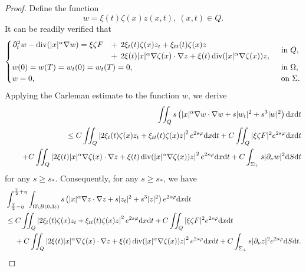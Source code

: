 \documentclass[11pt]{article}
\numberwithin{equation}{section}
\def\pt{\partial}
\def\e{\varepsilon }
\def\vp{\varphi}
\def\pt{\partial}
\def\Om{\Omega}
\def\al{\alpha}
\def\f{\frac}
\def\se{\setminus}
\def\df{\mathrm d}
\DeclareMathOperator{\Div}{div}
\begin{document}
\begin{proof}
			
			Define the function
			\begin{equation*}
				w=\xi(t)\zeta(x) z(x,t), \ (x,t)\in Q.
			\end{equation*}
			It can be readily verified that
			\begin{equation*}
				\begin{cases}
					\hspace{-1.5mm}
					\begin{array}{lll}
						\pt_t^2w-\Div(|x|^\al \nabla w)=\xi\zeta F
						&+\hspace{1.5mm}
						2\xi_t(t)\zeta(x)z_t+\xi_{tt}(t)\zeta(x)z\\
						&+\hspace{1.5mm}2\xi(t)|x|^\al \nabla \zeta(x)\cdot \nabla z+\xi(t) \Div(|x|^\al \nabla \zeta(x))z,
					\end{array} & \mbox{in }Q,\\
					w(0)=w(T)=w_t(0)=w_t(T)=0, & \mbox{in }\Om,\\
					w=0, & \mbox{on }\Sigma.
				\end{cases}
			\end{equation*}
			Applying the Carleman estimate to the function $w$, we derive
			\begin{eqnarray*}
				&& \iint_Q  s\left(|x|^\al \nabla w\cdot \nabla w+s|w_t|^2+s^3|w|^2\right)\df x\df t\\
				&&\leq C\iint_Q \left|2\xi_t(t)\zeta(x)z_t+\xi_{tt}(t)\zeta(x)z\right|^2e^{2s\vp}\df x\df t+C\iint_Q|\xi\zeta F|^2 e^{2s\vp}\df x\df t\\
				&&\hspace{4.5mm}+C\iint_Q\left|2\xi(t)|x|^\al \nabla \zeta(x)\cdot \nabla z+\xi(t) \Div(|x|^\al \nabla \zeta(x))z\right|^2e^{2s\vp}\df x\df t+C\int_{\Sigma_+} s|\pt_\nu w|^2 \df S\df t
			\end{eqnarray*}
			for any $s\geq s_*$.  Consequently, for any  $s\geq s_*$, we have
			\begin{equation}\label{10.03.4}
				\begin{split}
					&\int_{\f{T}{2}-\eta}^{\f{T}{2}+\eta}\int_{\Om\se B(0,3\e)} s\left(|x|^\al \nabla z\cdot \nabla z +s|z_t|^2+s^3|z|^2\right)e^{2s\vp}\df x\df t\\
					&\leq C\iint_Q \left|2\xi_t(t)\zeta(x)z_t+\xi_{tt}(t)\zeta(x)z\right|^2e^{2s\vp}\df x\df t+C\iint_Q|\xi\zeta F|^2 e^{2s\vp}\df x\df t\\
					&\hspace{4.5mm}+C\iint_Q\left|2\xi(t)|x|^\al \nabla \zeta(x)\cdot \nabla z+\xi(t) \Div(|x|^\al \nabla \zeta(x))z\right|^2e^{2s\vp}\df x\df t+C\int_{\Sigma_+} s|\pt_\nu z|^2e^{2s\vp}\df S\df t.

\end{split}
\end{equation}
\end{proof}
\end{document}
